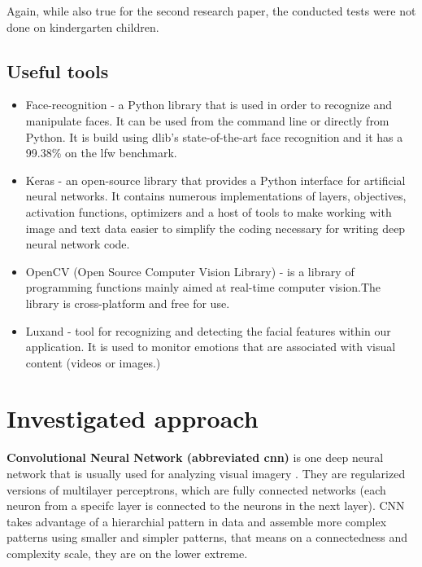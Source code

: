 \documentclass[runningheads,a4paper,11pt]{report}
\begin{document}
Again, while also true for the second research paper, the conducted tests were not done on kindergarten children.


\section{Useful tools}
\begin{itemize}
    \item Face-recognition - a Python library that is used in order to recognize and manipulate faces. It can be used from the command line or directly from Python. It is build using dlib's state-of-the-art face recognition and it has a 99.38\% on the \gls{lfw} benchmark.
    
    \item Keras - an open-source library that provides a Python interface for artificial neural networks. It contains numerous implementations of layers, objectives, activation functions, optimizers and a host of tools to make working with image and text data easier to simplify the coding necessary for writing deep neural network code.
    
    \item OpenCV (Open Source Computer Vision Library) - is a library of programming functions mainly aimed at real-time computer vision.The library is cross-platform and free for use.
    
    \item Luxand - tool for recognizing and detecting the facial features within our application. It is used to monitor emotions that are associated with visual content (videos or images.)
\end{itemize}

\chapter{Investigated approach}
\label{chapter:proposedApproach}

\textbf{Convolutional Neural Network (abbreviated \gls{cnn})} is one deep neural network that is usually used for analyzing visual imagery \cite{valueva2020}. They are regularized versions of multilayer perceptrons, which are fully connected networks (each neuron from a specifc layer is connected to the neurons in the next layer). \gls{CNN} takes advantage of a hierarchial pattern in data and assemble more complex patterns using smaller and simpler patterns, that means on a connectedness and complexity scale, they are on the lower extreme.
\end{document}
